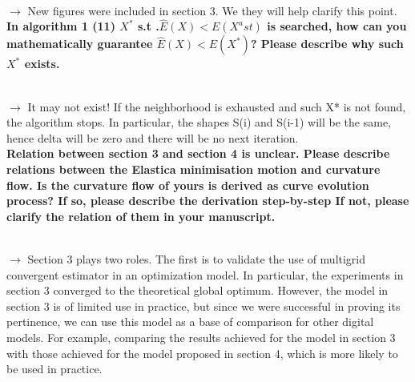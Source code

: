 \documentclass[12pt]{article}
\begin{document}
~\\
$\rightarrow$ New figures were included in section 3. We they will help clarify this point.
~\\


\textbf{In algorithm 1 (11) $X^\ast$ s.t .$\hat{E}(X)< E(X^ast)$ is searched, how can you mathematically guarantee $\hat{E}(X)< E(X^\ast)$? Please describe why such $X^{\ast}$ exists.}

~\\
$\rightarrow$ It may not exist! If the neighborhood is exhausted and such X* is not found, the algorithm stops. In particular, the shapes S(i) and S(i-1) will be the same, hence delta will be zero and there will be no next iteration.
~\\


\textbf{Relation between section 3 and section 4 is unclear.
Please describe relations between the Elastica minimisation motion and curvature flow.
Is the curvature flow of yours is derived as curve evolution process?
If so, please describe the derivation step-by-step
If not, please clarify the relation of them in your manuscript.}

~\\
$\rightarrow$ Section 3 plays two roles. The first is to validate the use of multigrid convergent estimator in an optimization model. In particular, the experiments in section 3 converged to the theoretical global optimum. However, the model in section 3 is of limited use in practice, but since we were successful in proving its pertinence, we can use this model as a base of comparison for other digital models. For example, comparing the results achieved for the model in section 3 with those achieved for the model proposed in section 4, which is more likely to be used in practice.
~\\




\end{document}
